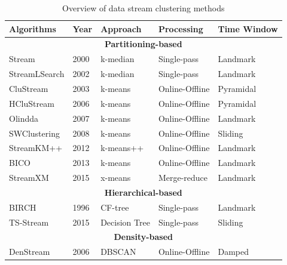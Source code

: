 \begin{table}[]
\centering
\small
\caption{Overview of data stream clustering methods \protect\cite{mansalis2018evaluation}}
\label{landmarkwin}
\begin{tabular}{lllll}
\hline
\textbf{Algorithms} & \textbf{Year} & \textbf{Approach} & \textbf{Processing} & \textbf{Time Window} \\ \hline \midrule
\multicolumn{5}{c}{\cellcolor[HTML]{C0C0C0}\textbf{Partitioning-based}}                              \\ \hline
Stream              & 2000          & k-median          & Single-pass         & Landmark             \\ \hline
StreamLSearch       & 2002          & k-median          & Single-pass         & Landmark             \\ \hline
CluStream           & 2003          & k-means           & Online-Offline      & Pyramidal            \\ \hline
HCluStream          & 2006          & k-means           & Online-Offline      & Pyramidal            \\ \hline
Olindda             & 2007          & k-means           & Online-Offline      & Landmark             \\ \hline
SWClustering        & 2008          & k-means           & Online-Offline      & Sliding              \\ \hline
StreamKM++          & 2012          & k-means++         & Online-Offline      & Landmark             \\ \hline
BICO                & 2013          & k-means           & Online-Offline      & Landmark             \\ \hline
StreamXM            & 2015          & x-means           & Merge-reduce        & Landmark             \\ \hline
\multicolumn{5}{c}{\cellcolor[HTML]{C0C0C0}\textbf{Hierarchical-based}}                              \\ \hline
BIRCH               & 1996          & CF-tree           & Single-pass         & Landmark             \\ \hline
TS-Stream           & 2015          & Decision Tree     & Single-pass         & Sliding              \\ \hline
\multicolumn{5}{c}{\cellcolor[HTML]{C0C0C0}\textbf{Density-based}}                                   \\ \hline
DenStream           & 2006          & DBSCAN            & Online-Offline      & Damped               \\ \hline

\end{tabular}
\end{table}
